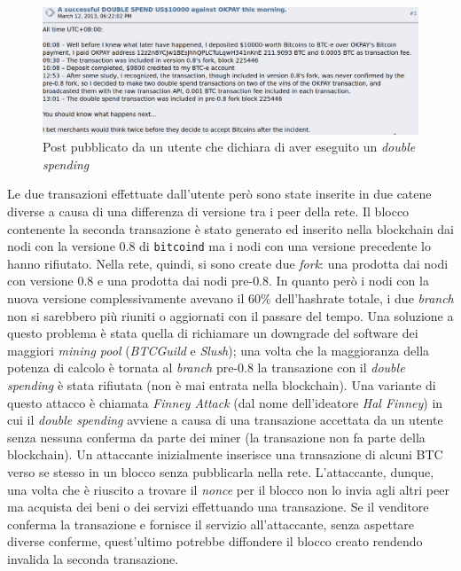 \begin{figure}[H]
    \centering
    \includegraphics[width=\textwidth]{images/double_spending_post.png}
    \caption{Post pubblicato da un utente che dichiara di aver eseguito un \textit{double spending}}
\end{figure}\clearpage
Le due transazioni effettuate dall'utente però sono state inserite in due catene diverse a causa di una differenza di versione tra i peer della rete. Il blocco contenente la seconda transazione è stato generato ed inserito nella blockchain dai nodi con la versione $0.8$ di \texttt{bitcoind} ma i nodi con una versione precedente lo hanno rifiutato. Nella rete, quindi, si sono create due \textit{fork}: una prodotta dai nodi con versione $0.8$ e una prodotta dai nodi pre-$0.8$. In quanto però i nodi con la nuova versione complessivamente avevano il $60\%$ dell'hashrate totale, i due \textit{branch} non si sarebbero più riuniti o aggiornati con il passare del tempo. Una soluzione a questo problema è stata quella di richiamare un downgrade del software dei maggiori \textit{mining pool} (\textit{BTCGuild} e \textit{Slush}); una volta che la maggioranza della potenza di calcolo è tornata al \textit{branch} pre-$0.8$ la transazione con il \textit{double spending} è stata rifiutata (non è mai entrata nella blockchain).
Una variante di questo attacco è chiamata \textit{Finney Attack} (dal nome dell'ideatore \textit{Hal Finney}) in cui il \textit{double spending} avviene a causa di una transazione accettata da un utente senza nessuna conferma da parte dei miner (la transazione non fa parte della blockchain). Un attaccante inizialmente inserisce una transazione di alcuni BTC verso se stesso in un blocco senza pubblicarla nella rete. L'attaccante, dunque, una volta che è riuscito a trovare il \textit{nonce} per il blocco non lo invia agli altri peer ma acquista dei beni o dei servizi effettuando una transazione. Se il venditore conferma la transazione e fornisce il servizio all'attaccante, senza aspettare diverse conferme, quest'ultimo potrebbe diffondere il blocco creato rendendo invalida la seconda transazione.

